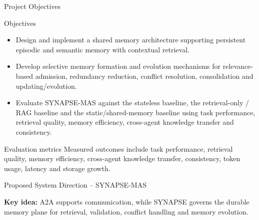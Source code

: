 \begin{frame}{Project Objectives}
\begin{exampleblock}{Objectives}
\begin{itemize}[leftmargin=1.5em,itemsep=4pt,topsep=4pt]
\item Design and implement a shared memory architecture supporting persistent episodic and semantic memory with contextual retrieval.
\item Develop selective memory formation and evolution mechanisms for relevance-based admission, redundancy reduction, conflict resolution, consolidation and updating/evolution.
\item Evaluate SYNAPSE-MAS against the stateless baseline, the retrieval-only / RAG baseline and the static/shared-memory baseline using task performance, retrieval quality, memory efficiency, cross-agent knowledge transfer and consistency.
\end{itemize}
\end{exampleblock}
\vspace{3mm}
\begin{block}{Evaluation metrics}
Measured outcomes include task performance, retrieval quality, memory efficiency, cross-agent knowledge transfer, consistency, token usage, latency and storage growth.
\end{block}
\end{frame}

\begin{frame}{Proposed System Direction -- SYNAPSE-MAS}
\centering
{}
\vspace{1mm}
\small\textbf{Key idea:} A2A supports communication, while SYNAPSE governs the durable memory plane for retrieval, validation, conflict handling and memory evolution.
\end{frame}
